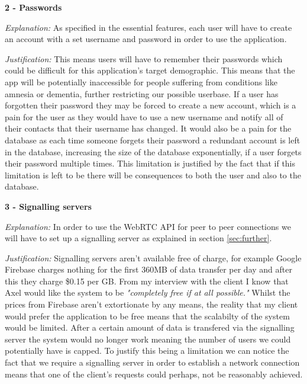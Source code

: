 \textsf{\bfseries 2 - Passwords} \\ \vspace{0.1cm}

\textit{Explanation:}
As specified in the essential features, each user will have to 
create an account with a set username and password in order to 
use the application. \vspace{0.1cm}

\textit{Justification:} This means users will have to remember 
their passwords which could be difficult for this application's
target demographic. This means that the app will be
potentially inaccessible for people suffering from conditions
like amnesia or dementia, further restricting our possible 
userbase. If a user has forgotten their password they
may be forced to create a new account, which is a pain for the 
user as they would have to use a new username and notify all of
their contacts that their username has changed. It would also 
be a pain for the database as each time someone forgets their 
password a redundant account is left in the database, 
increasing the size of the database exponentially, if a user 
forgets their password multiple times. This limitation is 
justified by the fact that if this limitation is left to be
there will be consequences to both the user and also to the 
database. \\ \vspace{0.2cm}

\textsf{\bfseries 3 - Signalling servers} \\ \vspace{0.1cm}

\textit{Explanation:}
In order to use the WebRTC API for peer to peer connections we
will have to set up a signalling server as explained in 
section \ref{sec:further}. \vspace{0.1cm}

\textit{Justification:}
Signalling servers aren't
available free of charge, for example Google Firebase charges
nothing for the 
first 360MB of data transfer per day and after this they charge
\$0.15 per GB. From my interview with the client I know that 
Axel would like the system to be \textit{"completely free if
at all possible."} Whilst the prices from Firebase aren't 
extortionate by any means, the reality that my client would
prefer the application to be free means that the scalabilty of
the system would be limited. After a certain amount of data is 
transfered via the signalling server the system would no longer
work meaning the number of users we could potentially have is 
capped. To justify this being a limitation we can notice 
the fact that we require a signalling server in order to
establish a network connection means that one of the client's
requests could perhaps, not be reasonably achieved. \\
\vspace{0.2cm}

